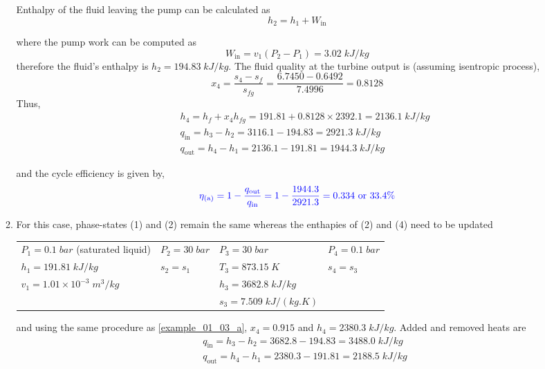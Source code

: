 \documentclass[12pts,a4paper,amsmath,amssymb,floatfix]{article}%
\newcommand{\frc}{\displaystyle\frac}
\begin{document}
\begin{enumerate}[label=\bfseries Example \arabic*]
\begin{enumerate}
Enthalpy of the fluid leaving the pump can be calculated as
\begin{displaymath}
h_{2}=h_{1}+W_{\text{in}}
\end{displaymath}

where the pump work can be computed as
\begin{displaymath}
W_{\text{in}}=v_{1}\left(P_{2}-P_{1}\right)=3.02\;kJ/kg
\end{displaymath}
therefore the fluid's enthalpy is $h_{2}=194.83\;kJ/kg$. The fluid quality at the turbine output is (assuming isentropic process),
\begin{displaymath}
x_{4}=\frc{s_{4}-s_{f}}{s_{fg}}=\frc{6.7450-0.6492}{7.4996}=0.8128
\end{displaymath}
Thus,
\begin{eqnarray}
&& h_{4}=h_{f}+x_{4}h_{fg}=191.81+0.8128\times 2392.1=2136.1\;kJ/kg \nonumber \\
&& q_{\text{in}}=h_{3}-h_{2}=3116.1-194.83=2921.3\;kJ/kg \nonumber \\
&& q_{\text{out}}=h_{4}-h_{1}=2136.1-191.81=1944.3\;kJ/kg
\end{eqnarray}

and the cycle efficiency is given by,
\begin{displaymath}
\textcolor{blue}{\eta_{\text{(a)}}=1-\frc{q_{\text{out}}}{q_{\text{in}}} = 1 - \frc{1944.3}{2921.3} = 0.334 \text{ or } 33.4\%}
\end{displaymath}

\item \label{example_01_03_b} For this case, phase-states (1) and (2) remain the same whereas the enthapies of (2) and (4) need to be updated

\begin{tabular}{l l l l}
$P_{1}=0.1\;bar$ (saturated liquid) &  $P_{2}=30\;bar$ & $P_{3}=30\;bar$           & $P_{4}=0.1\;bar$ \\
$h_{1}=191.81\;kJ/kg$               &  $s_{2}=s_{1}$   & $T_{3}=873.15\;K$         & $s_{4}=s_{3}$ \\
$v_{1}=1.01\times 10^{-3}\;m^{3}/kg$ &                  & $h_{3}=3682.8\;kJ/kg$     &                 \\
                                    &                 & $s_{3}=7.509\;kJ/(kg.K)$ &                 \\
\end{tabular}

and using the same procedure as \ref{example_01_03_a}, $x_{4}=0.915$ and $h_{4}=2380.3\;kJ/kg$. Added and removed heats are
\begin{eqnarray}
&& q_{\text{in}}=h_{3}-h_{2}=3682.8-194.83=3488.0\;kJ/kg \nonumber \\
&& q_{\text{out}}=h_{4}-h_{1}=2380.3-191.81=2188.5\;kJ/kg \nonumber \\
\end{eqnarray}


\end{enumerate}
\end{enumerate}
\end{document}
